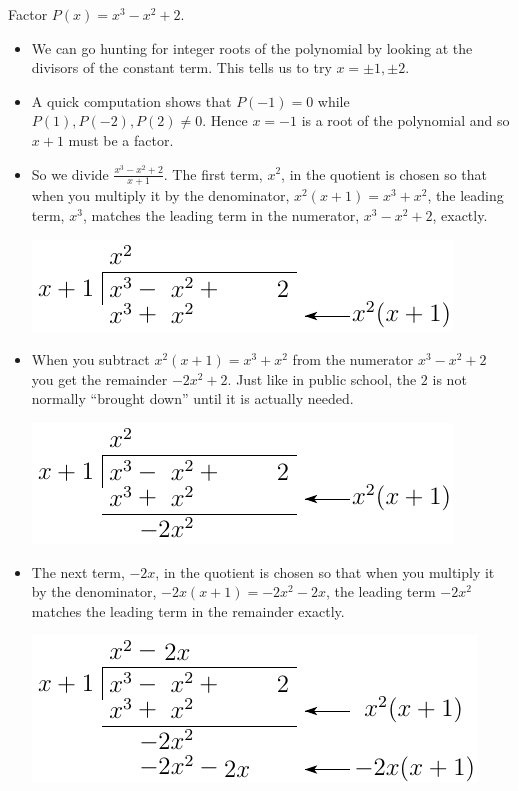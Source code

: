 \begin{eg}
Factor $P(x)=x^3-x^2+2$.

\soln
\begin{itemize}
 \item We can go hunting for integer roots of the polynomial by looking at the divisors
of the constant term. This tells us to try $x=\pm1, \pm2$.
\item A quick computation shows that $P(-1)=0$ while $P(1),P(-2),P(2) \neq 0$. Hence
$x=-1$ is a root of the polynomial and so $x+1$ must be a factor.
\item  So we divide  $\frac{x^3-x^2+2}{x+1}$. The first term, $x^2$, in the quotient
is chosen so that when you multiply it by the  denominator,
$x^2(x+1)=x^3+x^2$, the leading term, $x^3$,  matches the leading term
in the numerator, $x^3-x^2+2$, exactly.
\begin{center}
  \includegraphics{longdiv2}
\end{center}
\item When you subtract $x^2(x+1)=x^3+x^2$ from the numerator $x^3-x^2+2$ you
get the remainder $-2x^2+2$. Just like in public school, the $2$ is
not normally ``brought down'' until it is actually needed.
\begin{center}
  \includegraphics{longdiv3}
\end{center}
\item The next term, $-2x$, in the quotient is chosen so that when you multiply
it by the  denominator, $-2x(x+1)=-2x^2-2x$, the leading term
$-2x^2$  matches the leading term in the remainder exactly.
\begin{center}
  \includegraphics{longdiv4}

\end{center}
\end{itemize}
\end{eg}
